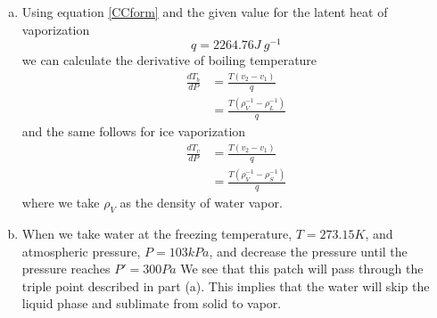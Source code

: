 \documentclass[11pt]{article}
\numberwithin{equation}{section}
\begin{document}
\begin{enumerate}[(a)]
\item Using equation \ref{CCform} and the given value for the latent heat of vaporization 
$$q = 2264.76\unit{J\ g^{-1}}$$
we can calculate the derivative of boiling temperature
\begin{align*}
\frac{dT_b}{dP} &= \frac{T(v_2-v_1)}{q}\\
&= \frac{T(\rho_{V}^{-1}-\rho_{L}^{-1})}{q}
\end{align*}
and the same follows for ice vaporization
\begin{align*}
\frac{dT_v}{dP} &= \frac{T(v_2-v_1)}{q}\\
&= \frac{T(\rho_{V}^{-1}-\rho_{S}^{-1})}{q}
\end{align*}
where we take $\rho_{V}$ as the density of water vapor.

\item When we take water at the freezing temperature, $T=273.15\unit{K}$, and atmospheric 
pressure, $P=103\unit{kPa}$, and decrease the pressure until the pressure reaches 
$P'=300\unit{Pa}$ We see that this patch will pass through the triple point described in 
part (a). This implies that the water will skip the liquid phase and sublimate from solid to 
vapor.


\end{enumerate}
\end{document}
